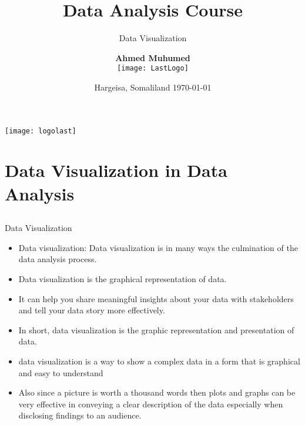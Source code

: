 \documentclass[12pt]{beamer}
\title[Data Visualization]{Data Analysis Course}
\subtitle{Data Visualization}
\author[Ahmed Muhumed]{\textbf{Ahmed Muhumed} \\ \vspace{0.5cm}
	\texttt{[image: LastLogo]}}
\institute[]{\large \textbf{Sahan Institute of Technology}}
\date[\today]
{Hargeisa, Somaliland \hspace{4.8cm} \today}
\begin{document}
	
	\frame{\titlepage}
	{
		\centering
		\texttt{[image: logolast]}
	}
	\section[Data Visualization in Data Analysis]{Data Visualization in Data Analysis}
	\subsection[]{}
	\begin{frame}{Data Visualization}
		\begin{itemize}
			\item Data visualization: Data visualization is in many ways the culmination of the data analysis process.
			\item Data visualization is the graphical representation of data.
			\item It can help you share meaningful insights about your data with stakeholders and tell your data story more effectively.
			\item In short, data visualization is the graphic representation and presentation of data.
			\item data visualization is a way to show a complex data in a form that is graphical and easy to understand 
			\item Also since a picture is worth a thousand words then plots and graphs can be very effective in conveying a clear description of the data especially when disclosing findings to an audience.
		\end{itemize}
		
	\end{frame}
\end{document}
